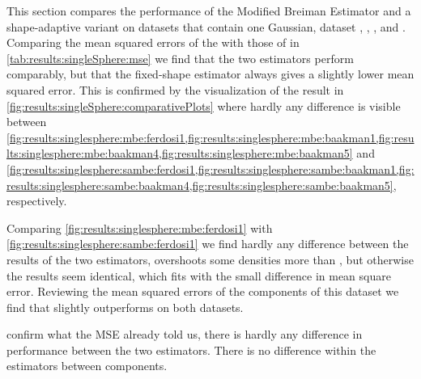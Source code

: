 
\begin{figure*}
	\centering
	
	\caption{Plot of the estimated density as a function of the known density of the datasets with a single Gaussian by (-) \mbe and (-) \sambe.}
	\label{fig:results:singleSphere:comparativePlots}
\end{figure*}

\begin{table}
	\centering
	
	\caption{Performance of the Modified Breiman Estimator with fixed-shaped and shape-adaptive kernels on the datasets with a single Gaussian.} 	
	\label{tab:results:singleSphere:mse}
\end{table}

This section compares the performance of the Modified Breiman Estimator and a shape-adaptive variant on datasets that contain one Gaussian, \ie dataset \ferdosiOne, \baakmanOne, \baakmanFour, and \baakmanFive. Comparing the mean squared errors of the \mbe with those of \sambe in \cref{tab:results:singleSphere:mse} we find that the two estimators perform comparably, but that the fixed-shape estimator always gives a slightly lower mean squared error. This is confirmed by the visualization of the result in \cref{fig:results:singleSphere:comparativePlots} where hardly any difference is visible between \cref{fig:results:singlesphere:mbe:ferdosi1,fig:results:singlesphere:mbe:baakman1,fig:results:singlesphere:mbe:baakman4,fig:results:singlesphere:mbe:baakman5} and \cref{fig:results:singlesphere:sambe:ferdosi1,fig:results:singlesphere:sambe:baakman1,fig:results:singlesphere:sambe:baakman4,fig:results:singlesphere:sambe:baakman5}, respectively.

		Comparing \cref{fig:results:singlesphere:mbe:ferdosi1} with \cref{fig:results:singlesphere:sambe:ferdosi1} we find hardly any difference between the results of the two estimators, \sambe overshoots some densities more than \mbe, but otherwise the results seem identical, which fits with the small difference in mean square error. 
		Reviewing the mean squared errors of the components of this dataset we find that \mbe slightly outperforms \sambe on both datasets.

		 confirm what the MSE already told us, there is hardly any difference in performance between the two estimators. 
		There is no difference within the estimators between components. 

